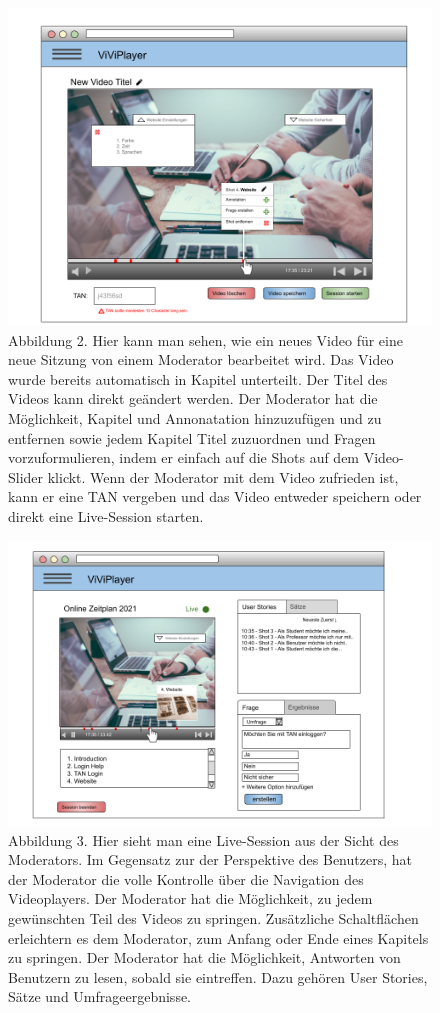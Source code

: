 \begin{figure}
  \includegraphics[width=\linewidth]{sections/pictures/5dot2.png}
  \caption{Abbildung 2. Hier kann man sehen, wie ein neues Video für eine neue Sitzung von einem Moderator bearbeitet wird. Das Video wurde bereits automatisch in Kapitel unterteilt. Der Titel des Videos kann direkt geändert werden. Der Moderator hat die Möglichkeit, Kapitel und Annonatation hinzuzufügen und zu entfernen sowie jedem Kapitel Titel zuzuordnen und Fragen vorzuformulieren, indem er einfach auf die Shots auf dem Video-Slider klickt. Wenn der Moderator mit dem Video zufrieden ist, kann er eine TAN vergeben und das Video entweder speichern oder direkt eine Live-Session starten.}
  \label{fig:5dot2}
\end{figure}

\begin{figure}
  \includegraphics[width=\linewidth]{sections/pictures/5dot3.png}
  \caption{Abbildung 3. Hier sieht man eine Live-Session aus der Sicht des Moderators. Im Gegensatz zur der Perspektive des Benutzers, hat der Moderator die volle Kontrolle über die Navigation des Videoplayers. Der Moderator hat die Möglichkeit, zu jedem gewünschten Teil des Videos zu springen. Zusätzliche Schaltflächen erleichtern es dem Moderator, zum Anfang oder Ende eines Kapitels zu springen. Der Moderator hat die Möglichkeit, Antworten von Benutzern zu lesen, sobald sie eintreffen. Dazu gehören User Stories, Sätze und Umfrageergebnisse.}
  \label{fig:5dot3}
\end{figure}

